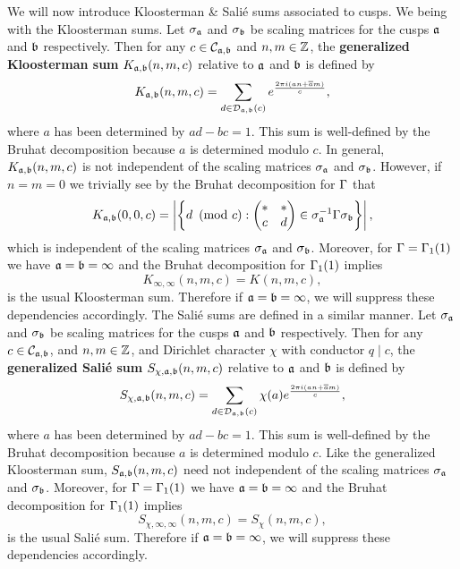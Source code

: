     We will now introduce Kloosterman \& Sali\'e sums associated to cusps. We being with the Kloosterman sums. Let $\sigma_{\mathfrak{a}}$ and $\sigma_{\mathfrak{b}}$ be scaling matrices for the cusps $\mathfrak{a}$ and $\mathfrak{b}$ respectively. Then for any $c \in \mathcal{C}_{\mathfrak{a},\mathfrak{b}}$ and $n,m \in \mathbb{Z}$, the \textbf{generalized Kloosterman sum} $K_{\mathfrak{a},\mathfrak{b}}(n,m,c)$ relative to $\mathfrak{a}$ and $\mathfrak{b}$ is defined by
    \[
      K_{\mathfrak{a},\mathfrak{b}}(n,m,c) = \sum_{d \in \mathcal{D}_{\mathfrak{a},\mathfrak{b}}(c)}e^{\frac{2\pi i(an+\overline{a}m)}{c}},
    \]
    where $a$ has been determined by $ad-bc = 1$. This sum is well-defined by the Bruhat decomposition because $a$ is determined modulo $c$. In general, $K_{\mathfrak{a},\mathfrak{b}}(n,m,c)$ is not independent of the scaling matrices $\sigma_{\mathfrak{a}}$ and $\sigma_{\mathfrak{b}}$. However, if $n = m = 0$ we trivially see by the Bruhat decomposition for $\Gamma$ that
    \[
      K_{\mathfrak{a},\mathfrak{b}}(0,0,c) = \left|\left\{d \ \left(\text{mod }c\right):\begin{pmatrix} \ast & \ast \\ c & d \end{pmatrix} \in \sigma_{\mathfrak{a}}^{-1}\Gamma\sigma_{\mathfrak{b}}\right\}\right|,
    \]
    which is independent of the scaling matrices $\sigma_{\mathfrak{a}}$ and $\sigma_{\mathfrak{b}}$. Moreover, for $\Gamma = \Gamma_{1}(1)$ we have $\mathfrak{a} = \mathfrak{b} = \infty$ and the Bruhat decomposition for $\Gamma_{1}(1)$ implies
    \[
      K_{\infty,\infty}(n,m,c) = K(n,m,c),
    \]
    is the usual Kloosterman sum. Therefore if $\mathfrak{a} = \mathfrak{b} = \infty$, we will suppress these dependencies accordingly. The Sali\'e sums are defined in a similar manner. Let $\sigma_{\mathfrak{a}}$ and $\sigma_{\mathfrak{b}}$ be scaling matrices for the cusps $\mathfrak{a}$ and $\mathfrak{b}$ respectively. Then for any $c \in \mathcal{C}_{\mathfrak{a},\mathfrak{b}}$, and $n,m \in \mathbb{Z}$, and Dirichlet character $\chi$ with conductor $q \mid c$, the \textbf{generalized Sali\'e sum} $S_{\chi,\mathfrak{a},\mathfrak{b}}(n,m,c)$ relative to $\mathfrak{a}$ and $\mathfrak{b}$ is defined by
    \[
      S_{\chi,\mathfrak{a},\mathfrak{b}}(n,m,c) = \sum_{d \in \mathcal{D}_{\mathfrak{a},\mathfrak{b}}(c)}\chi(a)e^{\frac{2\pi i(an+\overline{a}m)}{c}},
    \]
    where $a$ has been determined by $ad-bc = 1$. This sum is well-defined by the Bruhat decomposition because $a$ is determined modulo $c$. Like the generalized Kloosterman sum, $S_{\mathfrak{a},\mathfrak{b}}(n,m,c)$ need not independent of the scaling matrices $\sigma_{\mathfrak{a}}$ and $\sigma_{\mathfrak{b}}$. Moreover, for $\Gamma = \Gamma_{1}(1)$ we have $\mathfrak{a} = \mathfrak{b} = \infty$ and the Bruhat decomposition for $\Gamma_{1}(1)$ implies
    \[
      S_{\chi,\infty,\infty}(n,m,c) = S_{\chi}(n,m,c),
    \]
    is the usual Sali\'e sum. Therefore if $\mathfrak{a} = \mathfrak{b} = \infty$, we will suppress these dependencies accordingly.
